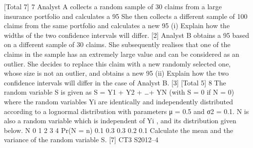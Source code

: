 [Total 7]
7 Analyst A collects a random sample of 30 claims from a large insurance portfolio and
calculates a 95%
She then collects a different sample of 100 claims from the same portfolio and
calculates a new 95%
(i) Explain how the widths of the two confidence intervals will differ. [2]
Analyst B obtains a 95%
based on a different sample of 30 claims. She subsequently realises that one of the
claims in the sample has an extremely large value and can be considered as an outlier.
She decides to replace this claim with a new randomly selected one, whose size is not
an outlier, and obtains a new 95%
(ii) Explain how the two confidence intervals will differ in the case of Analyst B.
[3]
[Total 5]
8 The random variable S is given as S = Y1 + Y2 + …+ YN (with S = 0 if N = 0) where
the random variables Yi are identically and independently distributed according to a
lognormal distribution with parameters μ = 0.5 and σ2 = 0.1. N is also a random
variable which is independent of Yi , and its distribution given below.
N 0 1 2 3 4
Pr(N = n) 0.1 0.3 0.3 0.2 0.1
Calculate the mean and the variance of the random variable S. [7]
CT3 S2012–4

